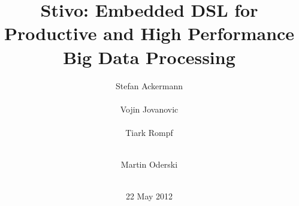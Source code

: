 \documentclass{acm_proc_article-sp}
\newcommand{\tool}{Stivo\xspace}
\begin{document}

    
  \title{\tool: Embedded DSL for Productive and High Performance Big Data Processing}


  \author{
	\alignauthor
	Stefan Ackermann\\
	 \\
        \alignauthor
        Vojin Jovanovic\\
        \\
        \alignauthor
        Tiark Rompf\\
        \\
\and
       \alignauthor
        Martin Oderski\\
        \\
  }
  
  
  
  
  \date{22 May 2012}
  \maketitle
  
  \begin{abstract}
    
  \end{abstract}
  


  
  
  
  
  
  
  
  
  

  
  
  
\end{document}
